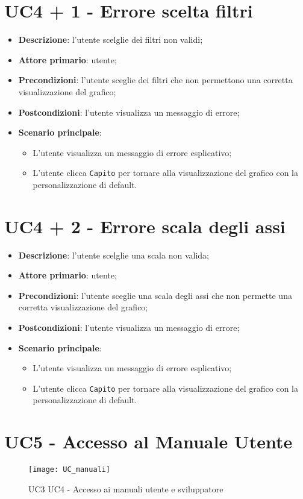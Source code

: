 \begin{itemize}
\section{UC4 + 1 - Errore scelta filtri}
\begin{itemize}
  \item \textbf{Descrizione}: l'utente scelglie dei filtri non validi;
  \item \textbf{Attore primario}: utente;
  \item \textbf{Precondizioni}: l'utente sceglie dei filtri che non permettono una corretta visualizzazione del grafico;
  \item \textbf{Postcondizioni}: l'utente visualizza un messaggio di errore;
  \item \textbf{Scenario principale}: 
    \begin{itemize}
      \item L'utente visualizza un messaggio di errore esplicativo;
      \item L'utente clicca \texttt{Capito} per tornare alla visualizzazione del grafico con la personalizzazione di default.
    \end{itemize}
\end{itemize}

\section{UC4 + 2 - Errore scala degli assi}
\begin{itemize}
  \item \textbf{Descrizione}: l'utente scelglie una scala non valida;
  \item \textbf{Attore primario}: utente;
  \item \textbf{Precondizioni}: l'utente sceglie una scala degli assi che non permette una corretta visualizzazione del grafico;
  \item \textbf{Postcondizioni}: l'utente visualizza un messaggio di errore;
  \item \textbf{Scenario principale}:  
    \begin{itemize}
      \item L'utente visualizza un messaggio di errore esplicativo;
      \item L'utente clicca \texttt{Capito} per tornare alla visualizzazione del grafico con la personalizzazione di default.
    \end{itemize}
\end{itemize}

\section{UC5 - Accesso al Manuale Utente}
\begin{figure}[h]
  \centering
  \texttt{[image: UC\_manuali]}
  \caption{UC3 UC4 - Accesso ai manuali utente e sviluppatore}
\end{figure}


\end{itemize}
